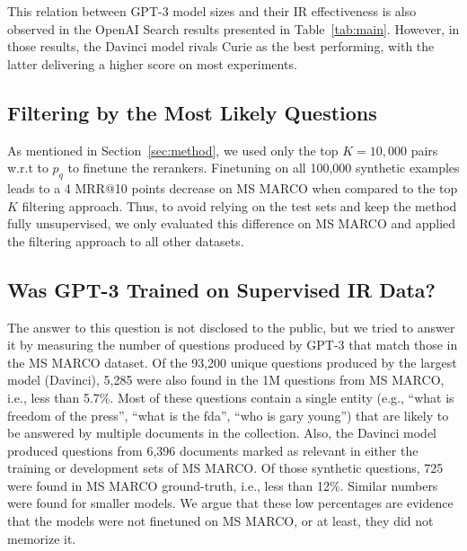 \documentclass[11pt]{article}
\begin{document}

This relation between GPT-3 model sizes and their IR effectiveness is also observed in the OpenAI Search results presented in Table~\ref{tab:main}. However, in those results, the Davinci model rivals Curie as the best performing, with the latter delivering a higher score on most experiments.


\subsection{Filtering by the Most Likely Questions}
\label{sec:filtering_ablation}
As mentioned in Section~\ref{sec:method}, we used only the top $K=10,000$ pairs w.r.t to $p_q$ to finetune the rerankers. %
Finetuning on all 100,000 synthetic examples leads to a 4 MRR@10 points decrease on MS MARCO when compared to the top $K$ filtering approach. Thus, to avoid relying on the test sets and keep the method fully unsupervised, we only evaluated this difference on MS MARCO and applied the filtering approach to all other datasets.

\subsection{Was GPT-3 Trained on Supervised IR Data?}

The answer to this question is not disclosed to the public, but we tried to answer it by measuring the number of questions produced by GPT-3 that match those in the MS MARCO dataset. Of the 93,200 unique questions produced by the largest model (Davinci), 5,285 were also found in the 1M questions from MS MARCO, i.e., less than 5.7\%. Most of these questions contain a single entity (e.g., ``what is freedom of the press'', ``what is the fda'', ``who is gary young'') that are likely to be answered by multiple documents in the collection.
Also, the Davinci model produced questions from 6,396 documents marked as relevant in either the training or development sets of MS MARCO. Of those synthetic questions, 725 were found in MS MARCO ground-truth, i.e., less than 12\%.
Similar numbers were found for smaller models.
We argue that these low percentages are evidence that the models were not finetuned on MS MARCO, or at least, they did not memorize it.
\end{document}
